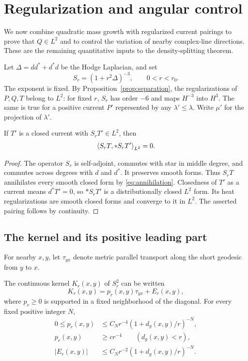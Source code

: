 \section{Regularization and angular control}\label{sec:energy}

We now combine quadratic mass growth with regularized current
pairings to prove that \(Q\in L^2\) and to control the variation
of nearby complex-line directions. These are the remaining
quantitative inputs to the density-splitting theorem.

Let \(\Delta=dd^*+d^*d\) be the Hodge Laplacian, and set
\[
S_r=(1+r^2\Delta)^{-3},\qquad 0<r<r_0.
\]
The exponent is fixed. By Proposition~\ref{prop:separation},
the regularizations of \(P,Q,T\) belong to \(L^2\):
for fixed \(r\), \(S_r\) has order \(-6\) and maps
\(H^{-3}\) into \(H^3\).
The same is true for a positive current \(P'\) represented
by any \(\lambda'\le\lambda\).
Write \(\mu'\) for the projection of \(\lambda'\).

\begin{lemma}\label{lem:zero-pairing}
If \(T'\) is a closed current with \(S_rT'\in L^2\), then
\begin{equation}\label{eq:zero-pairing}
\left\langle S_rT,*S_rT'\right\rangle_{L^2}=0.
\end{equation}
\end{lemma}

\begin{proof}
The operator \(S_r\) is self-adjoint, commutes with star in
middle degree, and commutes across degrees with \(d\) and
\(d^*\). It preserves smooth forms. Thus \(S_rT\) annihilates
every smooth closed form by \eqref{eq:annihilation}.
Closedness of \(T'\) as a current means \(d^*T'=0\), so
\(*S_rT'\) is a distributionally closed \(L^2\) form.
Its heat regularizations
are smooth closed forms and converge to it in \(L^2\).
The asserted pairing follows by continuity.
\end{proof}

\subsection{The kernel and its positive leading part}

For nearby \(x,y\), let \(\tau_{yx}\) denote metric parallel
transport along the short geodesic from \(y\) to \(x\).
\begin{lemma}\label{lem:kernel}
The continuous kernel \(K_r(x,y)\) of \(S_r^2\) can be written
\[
K_r(x,y)=p_r(x,y)\tau_{yx}+E_r(x,y),
\]
where \(p_r\ge0\) is supported in a fixed neighborhood of the
diagonal. For every fixed positive integer \(N\),
\begin{align}
0\le p_r(x,y)&\le C_Nr^{-4}(1+d_g(x,y)/r)^{-N},
\label{eq:p-upper}\\
p_r(x,y)&\ge cr^{-4}\qquad(d_g(x,y)<r),
\label{eq:p-lower}\\
|E_r(x,y)|&\le C_Nr^{-2}(1+d_g(x,y)/r)^{-N}.
\label{eq:error-kernel}
\end{align}
\end{lemma}

